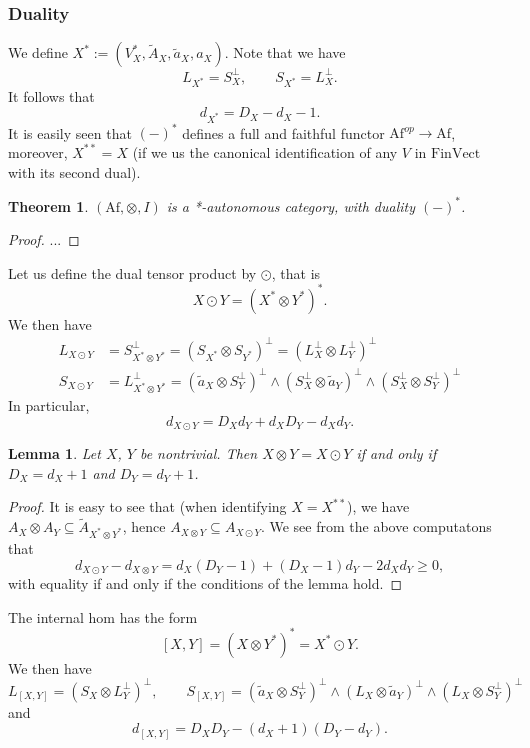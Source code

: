 \documentclass[12pt]{article}
\newtheorem{lemma}{Lemma}
\newtheorem{theorem}{Theorem}
\theoremstyle{definition}
\theoremstyle{remark}
\def \Af{\mathrm{Af}}
\def \FV{\mathrm{FinVect}}
\begin{document}
\subsubsection{Duality}

We define $X^*:=(V_X^*,\tilde A_X,\tilde a_X,a_X)$. Note that we have
\[
L_{X^*}=S_X^\perp,\qquad S_{X^*}=L_X^\perp.
\]
It follows that
\[
d_{X^*}=D_X-d_X-1.
\]
It is easily seen  that $(-)^*$ defines a full and faithful functor $\Af^{op}\to \Af$,
moreover, $X^{**}=X$ (if we us the canonical identification of  any $V$ in $\FV$ with its second dual). 


\begin{theorem} $(\Af,\otimes,I)$ is a *-autonomous category, with duality $(-)^*$.

\end{theorem}


\begin{proof}...

\end{proof}

Let us define the dual tensor product by $\odot$, that is
\[
X\odot Y=(X^*\otimes Y^*)^*.
\]
We then have
\begin{align*}
L_{X\odot Y}&=S^\perp_{X^*\otimes Y^*}=(S_{X^*}\otimes S_{Y^*})^\perp=(L_X^\perp\otimes
L_Y^\perp)^\perp\\
S_{X\odot Y}&= L_{X^*\otimes Y^*}^\perp=(\tilde a_X\otimes
S_Y^\perp)^\perp\wedge(S_X^\perp\otimes \tilde a_Y)^\perp\wedge (S_X^\perp\otimes
S_Y^\perp)^\perp
\end{align*}
In particular,
\[
d_{X\odot Y}=D_Xd_Y+d_XD_Y-d_Xd_Y.
\]
\begin{lemma}\label{lemma:tensors} Let $X$, $Y$ be nontrivial. Then $X\otimes Y=X\odot Y$
if and only if $D_X=d_X+1$ and $D_Y=d_Y+1$.

\end{lemma}

\begin{proof} It is easy to see that (when identifying $X=X^{**}$), we have $A_X\otimes
A_Y\subseteq \tilde A_{X^*\otimes  Y^*}$, hence $A_{X\otimes Y}\subseteq A_{X\odot Y}$. We see from the above computatons that
\[
d_{X\odot Y}-d_{X\otimes Y}=d_X(D_Y-1)+(D_X-1)d_Y-2d_Xd_Y\ge 0,
\]
with equality if and only if the conditions of the lemma hold.

\end{proof}



The internal hom has the form
\[
[X,Y]=(X\otimes Y^*)^*=X^*\odot Y.
\]
We then have
\[
L_{[X,Y]}=(S_X\otimes L_Y^\perp)^\perp,\qquad S_{[X,Y]}=(\tilde a_X\otimes
S_Y^\perp)^\perp\wedge(L_X\otimes \tilde a_Y)^\perp\wedge (L_X\otimes
S_Y^\perp)^\perp
\]
and
\[
d_{[X,Y]}=D_XD_Y-(d_X+1)(D_Y-d_Y).
\]
\end{document}
